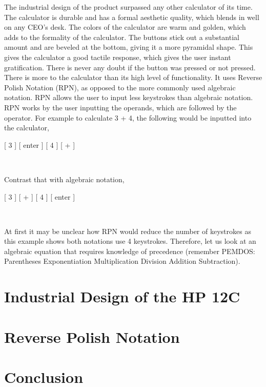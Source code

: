 \documentclass{article}
\begin{document}
The industrial design of the product surpassed any other calculator of its time.  The calculator is durable and has a formal aesthetic quality, which blends in well on any CEO’s desk.  The colors of the calculator are warm and golden, which adds to the formality of the calculator.  The buttons stick out a substantial amount and are beveled at the bottom, giving it a more pyramidal shape.  This gives the calculator a good tactile response, which gives the user instant gratification.  There is never any doubt if the button was pressed or not pressed.\\

There is more to the calculator than its high level of functionality.  It uses Reverse Polish Notation (RPN), as opposed to the more commonly used algebraic notation.  RPN allows the user to input less keystrokes than algebraic notation.  RPN works by the user inputting the operands, which are followed by the operator.  For example to calculate 3 + 4, the following would be inputted into the calculator,\\

\centerline{[ 3 ] [ enter ] [ 4 ] [ + ]}
\

Contrast that with algebraic notation,\\

\centerline{[ 3 ] [ + ] [ 4 ] [ enter ]\linebreak}
\

At first it may be unclear how RPN would reduce the number of keystrokes as this example shows both notations use 4 keystrokes.  Therefore, let us look at an algebraic equation that requires knowledge of precedence (remember PEMDOS: Parentheses Exponentiation Multiplication Division Addition Subtraction).




\section{Industrial Design of the HP 12C}
\label{Industrial Design of the HP 12C}

\section{Reverse Polish Notation}
\label{Reverse Polish Notation}

\section{Conclusion}
\label{Conclusion}
\end{document}
